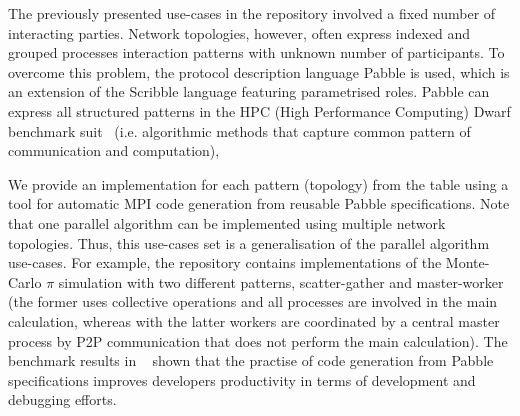 The previously presented use-cases in the repository
involved a fixed number of interacting parties.
Network topologies, however, often express indexed and grouped processes interaction patterns with unknown number of participants. To overcome this problem, the protocol description
language Pabble is used, which is an extension
of the Scribble language featuring parametrised
roles.
Pabble can express all structured patterns in the
HPC (High Performance Computing) Dwarf benchmark suit~\cite{BerkleyPar} (i.e. algorithmic methods that capture common pattern of communication and computation), 


We provide an implementation for each pattern (topology) from the table using a tool for automatic MPI code generation
from reusable Pabble specifications. Note that one parallel algorithm can be implemented using multiple network topologies. Thus, this use-cases set is a generalisation of the parallel algorithm use-cases. For example, the repository contains implementations of the Monte-Carlo $\pi$ simulation with two different patterns, scatter-gather and master-worker (the former uses collective operations and all processes are involved in the main calculation, whereas with the latter
workers are coordinated by a central master process by P2P communication that does not perform the main calculation).
The benchmark results in ~\cite{NCY2015} shown that the practise
of code generation from Pabble specifications improves developers
productivity in terms of development and debugging efforts.

